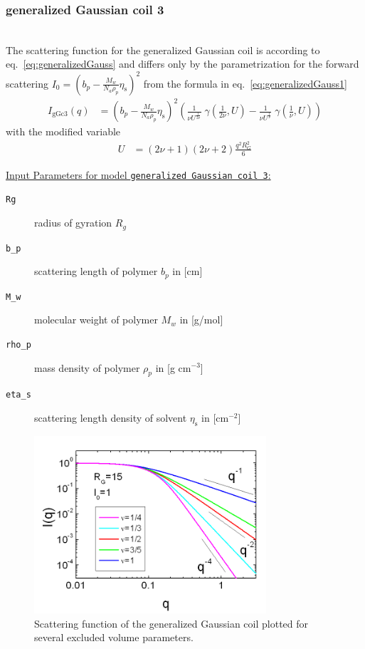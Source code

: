 \subsubsection{generalized Gaussian coil 3} \cite{Hammouda,Hammouda2012}
\label{sect:generalized_gaussian_coil3}
~\\
The scattering function for the generalized Gaussian coil is according to eq.\ \ref{eq:generalizedGauss}
and differs only by the parametrization for the forward scattering
$I_0=(b_p-\frac{M_w}{N_a\rho_p}\eta_\text{s})^2$ from the formula in eq.\ \ref{eq:generalizedGauss1}
\begin{align}
I_\text{gGc3}(q) &= \left(b_p-\frac{M_w}{N_a\rho_p}\eta_\text{s}\right)^2
\left(
\frac{1}{\nu U^{\frac{1}{2 \nu}}} \; \gamma\left(\frac{1}{2 \nu},U\right)-
\frac{1}{\nu U^{\frac{1}{  \nu}}} \; \gamma\left(\frac{1}{  \nu},U\right)
\right)
\label{eq:generalizedGauss3}
\end{align}
with the modified variable
\begin{align}
U&= \left(2\nu+1\right)\left(2\nu+2\right)\frac{q^2R_G^2}{6}
\end{align}

\vspace{5mm}
\underline{Input Parameters for model \texttt{generalized Gaussian coil 3}:}
\begin{description}
\item[\texttt{Rg}] radius of gyration $R_g$
\item[\texttt{b\_p}] scattering length of polymer $b_p$ in [cm]
\item[\texttt{M\_w}] molecular weight of polymer $M_w$ in [g/mol]
\item[\texttt{rho\_p}] mass density of polymer $\rho_p$ in [g cm$^{-3}$]
\item[\texttt{eta\_s}] scattering length density of solvent $\eta_\text{s}$ in [cm$^{-2}$]
\end{description}
\vspace{5mm}

\begin{figure}[htb]
\begin{center}
\includegraphics[width=0.768\textwidth,height=0.588\textwidth]{generalized_gaussian_coils.png}
\end{center}
\caption{Scattering function of the generalized Gaussian coil plotted for several excluded volume parameters.}
\label{fig:I_generalized_gaussian_coils}
\end{figure}

